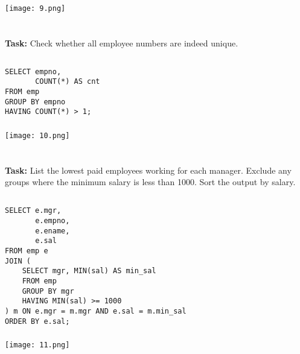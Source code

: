 \documentclass[12pt,a4paper]{article}
\begin{document}
\subsubsection{}
\begin{center}
    \texttt{[image: 9.png]}
\end{center}


\section{}
\textbf{Task:} Check whether all employee numbers are indeed unique.

\subsection{}
\begin{lstlisting}
SELECT empno,
       COUNT(*) AS cnt
FROM emp
GROUP BY empno
HAVING COUNT(*) > 1;
\end{lstlisting}

\subsubsection{}
\begin{center}
    \texttt{[image: 10.png]}
\end{center}


\section{}
\textbf{Task:} List the lowest paid employees working for each manager. Exclude any
groups where the minimum salary is less than 1000. Sort the output by
salary.

\subsection{}
\begin{lstlisting}
SELECT e.mgr,
       e.empno,
       e.ename,
       e.sal
FROM emp e
JOIN (
    SELECT mgr, MIN(sal) AS min_sal
    FROM emp
    GROUP BY mgr
    HAVING MIN(sal) >= 1000
) m ON e.mgr = m.mgr AND e.sal = m.min_sal
ORDER BY e.sal;
\end{lstlisting}

\subsubsection{}
\begin{center}
    \texttt{[image: 11.png]}
\end{center}
\end{document}
